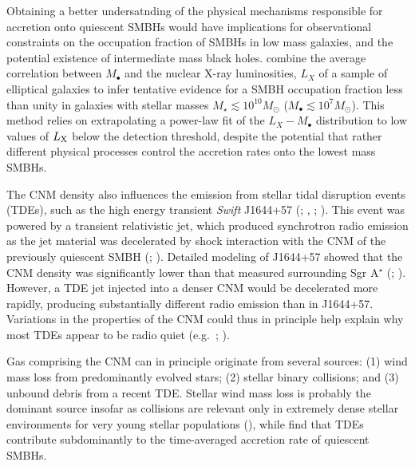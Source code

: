 \documentclass[usenatbib,fleqn]{mn2e}
\newcommand{\Mbh}[1][]{M_{\bullet#1}}
\begin{document}
Obtaining a better undersatnding of the physical mechanisms
responsible for accretion onto quiescent SMBHs would have implications
for observational constraints on the occupation fraction of SMBHs in
low mass galaxies, and the potential existence of intermediate mass
black holes.  \citet{Miller+15} combine the average correlation
between $\Mbh$ and the nuclear X-ray luminosities, $L_{X}$ of a sample
of elliptical galaxies to infer tentative evidence for a SMBH
occupation fraction less than unity in galaxies with stellar masses
$M_{\star} \lesssim 10^{10}M_{\odot}$ ($M_{\bullet} \lesssim
10^{7}M_{\odot}$).  This method relies on extrapolating a power-law
fit of the $L_X-\Mbh$ distribution to low values of $L_{\rm X}$ below
the detection threshold, despite the potential that rather different
physical processes control the accretion rates onto the lowest mass
SMBHs.


The CNM density also influences the emission from stellar tidal
disruption events (TDEs), such as the high energy transient {\it
  Swift} J1644+57 (\citealt{Levan+11}; \citealt{Bloom+11},
\citealt{Burrows+11}; \citealt{Zauderer+11}).  This event was powered
by a transient relativistic jet, which produced synchrotron radio
emission as the jet material was decelerated by shock interaction with
the CNM of the previously quiescent SMBH
(\citealt{Giannios&Metzger11}; \citealt{Zauderer+11}).  Detailed
modeling of J1644+57 showed that the CNM density was significantly
lower than that measured surrounding Sgr A$^{\star}$
(\citealt{Metzger+12}; \citealt{Berger+12}).  However, a TDE jet
injected into a denser CNM would be decelerated more rapidly,
producing substantially different radio emission than in J1644+57.
Variations in the properties of the CNM could thus in principle help
explain why most TDEs appear to be radio quiet
(e.g.~\citealt{Bower+13}; \citealt{VanVelzen+13}).

Gas comprising the CNM can in principle originate from several
sources: (1) wind mass loss from predominantly evolved stars; (2)
stellar binary collisions; and (3) unbound debris from a recent TDE.
Stellar wind mass loss is probably the dominant source insofar as
collisions are relevant only in extremely dense stellar environments
for very young stellar populations (\citealt{Rubin&Loeb11}), while
\citet{MacLeod+13} find that TDEs contribute subdominantly to the
time-averaged accretion rate of quiescent SMBHs.
\end{document}
